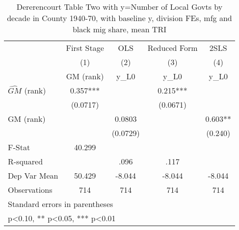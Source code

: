 \begin{table}[htbp]\centering
\def\sym#1{\ifmmode^{#1}\else\(^{#1}\)\fi}
\caption{Dererencourt Table Two with y=Number of Local Govts by decade in County 1940-70, with baseline y, division FEs, mfg and black mig share, mean TRI}
\begin{tabular}{l*{4}{c}}
\toprule
                    & First Stage   &         OLS   &Reduced Form   &        2SLS   \\
                    &\multicolumn{1}{c}{(1)}&\multicolumn{1}{c}{(2)}&\multicolumn{1}{c}{(3)}&\multicolumn{1}{c}{(4)}\\
                    &\multicolumn{1}{c}{GM  (rank)}&\multicolumn{1}{c}{y\_L0}&\multicolumn{1}{c}{y\_L0}&\multicolumn{1}{c}{y\_L0}\\
\midrule
$\hat{GM}$ (rank)   &       0.357***&               &       0.215***&               \\
                    &    (0.0717)   &               &    (0.0671)   &               \\
\addlinespace
GM  (rank)          &               &      0.0803   &               &       0.603** \\
                    &               &    (0.0729)   &               &     (0.240)   \\
\midrule
F-Stat              &      40.299   &               &               &               \\
R-squared           &               &        .096   &        .117   &               \\
Dep Var Mean        &      50.429   &      -8.044   &      -8.044   &      -8.044   \\
Observations        &         714   &         714   &         714   &         714   \\
\bottomrule
\multicolumn{5}{l}{\footnotesize Standard errors in parentheses}\\
\multicolumn{5}{l}{\footnotesize * p<0.10, ** p<0.05, *** p<0.01}\\
\end{tabular}
\end{table}
